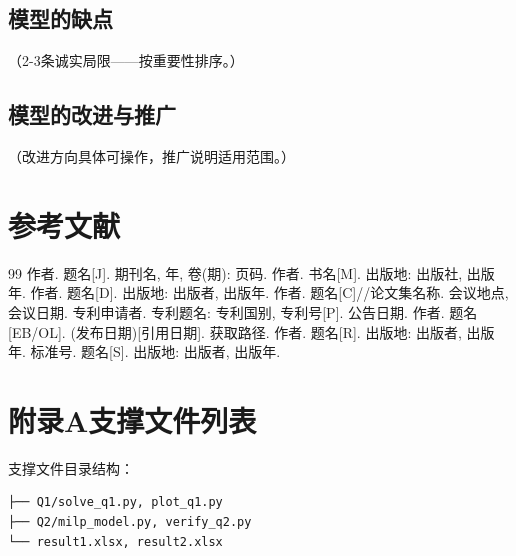 \documentclass[12pt,a4paper]{article}
\numberwithin{equation}{section}
\numberwithin{figure}{section}
\numberwithin{table}{section}
\begin{document}
\subsection{模型的缺点}
（2-3条诚实局限——按重要性排序。）
\subsection{模型的改进与推广}
（改进方向具体可操作，推广说明适用范围。）

\section{参考文献}
\begin{thebibliography}{99}
 作者. 题名[J]. 期刊名, 年, 卷(期): 页码.
 作者. 书名[M]. 出版地: 出版社, 出版年.
 作者. 题名[D]. 出版地: 出版者, 出版年.
 作者. 题名[C]//论文集名称. 会议地点, 会议日期.
 专利申请者. 专利题名: 专利国别, 专利号[P]. 公告日期.
 作者. 题名[EB/OL]. (发布日期)[引用日期]. 获取路径.
 作者. 题名[R]. 出版地: 出版者, 出版年.
 标准号. 题名[S]. 出版地: 出版者, 出版年.
\end{thebibliography}

\appendix
\renewcommand{\thesection}{附录\Alph{section}}

\section*{附录A\quad 支撑文件列表}
支撑文件目录结构：
\begin{verbatim}
├── Q1/solve_q1.py, plot_q1.py
├── Q2/milp_model.py, verify_q2.py
└── result1.xlsx, result2.xlsx
\end{verbatim}


\end{document}
